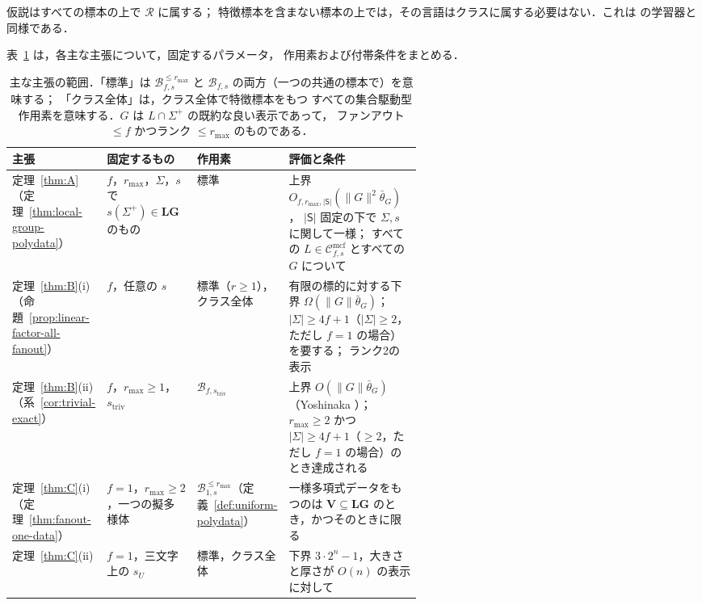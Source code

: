 \documentclass[11pt,a4paper]{ltjsarticle}
\numberwithin{equation}{section}
\theoremstyle{plain}
\theoremstyle{definition}
\theoremstyle{remark}
\newcommand{\Cmcf}[2]{\mathcal{C}^{\mathrm{mcf}}_{#1,#2}}
\theoremstyle{plain}
\begin{document}
仮説はすべての標本の上で $\mathcal R$ に属する；
特徴標本を含まない標本の上では，その言語はクラスに属する必要はない．これは
\cite{Yoshinaka2011} の学習器と同様である．

表~\ref{tab:scope} は，各主な主張について，固定するパラメータ，
作用素および付帯条件をまとめる．

\begin{table}[htbp]
\caption{主な主張の範囲．「標準」は
$\mathcal B^{\le r_{\max}}_{f,s}$ と $\mathcal B_{f,s}$ の両方（一つの共通の標本で）を意味する；
「クラス全体」は，クラス全体で特徴標本をもつ
すべての集合駆動型作用素を意味する．$G$ は $L\cap\Sigma^+$ の既約な良い表示であって，
ファンアウト $\le f$ かつランク $\le r_{\max}$ のものである．}
\label{tab:scope}
\centering
\footnotesize
\setlength{\tabcolsep}{3pt}
\renewcommand{\arraystretch}{1.15}
\begin{tabularx}{\linewidth}{@{}>{\raggedright\arraybackslash}p{0.2\linewidth}>{\raggedright\arraybackslash}p{0.22\linewidth}>{\raggedright\arraybackslash}p{0.17\linewidth}>{\raggedright\arraybackslash}X@{}}
\hline
主張 & 固定するもの & 作用素 & 評価と条件\\
\hline
定理~\ref{thm:A}（定理~\ref{thm:local-group-polydata}）
 & $f$，$r_{\max}$，$\Sigma$，$s$ で $s(\Sigma^+)\in\mathbf{LG}$ のもの
 & 標準
 & 上界 $O_{f,r_{\max},|\mathsf S|}(\|G\|^2\bar\theta_G)$，
    $|\mathsf S|$ 固定の下で $\Sigma,s$ に関して一様；
    すべての $L\in\Cmcf{f}{s}$ とすべての $G$ について\\
定理~\ref{thm:B}(i)（命題~\ref{prop:linear-factor-all-fanout}）
 & $f$，任意の $s$
 & 標準（$r\ge1$），クラス全体
 & 有限の標的に対する下界 $\Omega(\|G\|\bar\theta_G)$；$|\Sigma|\ge4f+1$（$|\Sigma|\ge2$，ただし $f=1$ の場合）を要する；
   ランク2の表示\\
定理~\ref{thm:B}(ii)（系~\ref{cor:trivial-exact}）
 & $f$，$r_{\max}\ge1$，$s_{\mathrm{triv}}$
 & $\mathcal B_{f,s_{\mathrm{triv}}}$
 & 上界 $O(\|G\|\bar\theta_G)$（Yoshinaka \cite{Yoshinaka2011}）；$r_{\max}\ge2$ かつ $|\Sigma|\ge4f+1$（$\ge2$，ただし $f=1$ の場合）のとき達成される\\
定理~\ref{thm:C}(i)（定理~\ref{thm:fanout-one-data}）
 & $f=1$，$r_{\max}\ge2$，一つの擬多様体
 & $\mathcal B^{\le r_{\max}}_{1,s}$（定義~\ref{def:uniform-polydata}）
 & 一様多項式データをもつのは $\mathbf V\subseteq\mathbf{LG}$ のとき，かつそのときに限る\\
定理~\ref{thm:C}(ii)
  & $f=1$，三文字上の $s_U$
 & 標準，クラス全体
 & 下界 $3\cdot2^n-1$，大きさと厚さが $O(n)$ の表示に対して\\

\end{tabularx}
\end{table}
\end{document}
